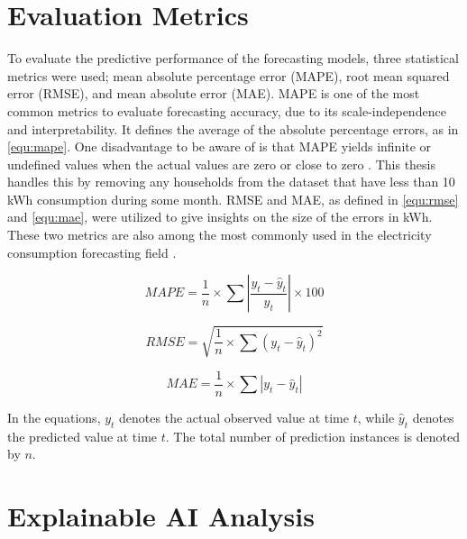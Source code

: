 \section{Evaluation Metrics}
To evaluate the predictive performance of the forecasting models, three statistical metrics were used; mean absolute percentage error (MAPE), root mean squared error (RMSE), and mean absolute error (MAE). MAPE is one of the most common metrics to evaluate forecasting accuracy, due to its scale-independence and interpretability. It defines the average of the absolute percentage errors, as in \autoref{equ:mape}. One disadvantage to be aware of is that MAPE yields infinite or undefined values when the actual values are zero or close to zero \cite{kim_new_2016}. This thesis handles this by removing any households from the dataset that have less than 10 kWh consumption during some month. RMSE and MAE, as defined in \autoref{equ:rmse} and \autoref{equ:mae}, were utilized to give insights on the size of the errors in kWh. These two metrics are also among the most commonly used in the electricity consumption forecasting field \cite{nti_electricity_2020}.

\begin{equation}\label{equ:mape}
    MAPE = \frac{1}{n} \times \sum \left| \frac{y_t - \hat{y}_t}{y_t} \right| \times 100
\end{equation}

\begin{equation}\label{equ:rmse}
    RMSE = \sqrt{\frac{1}{n} \times \sum (y_t - \hat{y}_t)^2}
\end{equation}

\begin{equation}\label{equ:mae}
    MAE = \frac{1}{n} \times \sum \left| y_t - \hat{y}_t \right|
\end{equation}

In the equations, $y_t$ denotes the actual observed value at time $t$, while $\hat{y}_t$ denotes the predicted value at time $t$. The total number of prediction instances is denoted by $n$.

\section{Explainable AI Analysis}

